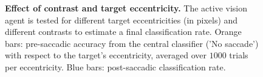 \begin{figure}[t!]%
	\caption{
		{\bf Effect of contrast and target eccentricity.} %
		The active vision agent is tested for different target eccentricities (in pixels) and different contrasts to estimate a final classification rate. Orange bars: pre-saccadic accuracy from the central classifier ('No saccade') with respect to the target's eccentricity, averaged over $1000$ trials per eccentricity. Blue bars: post-saccadic classification rate. %
		\label{fig:results}}%
\end{figure}%




